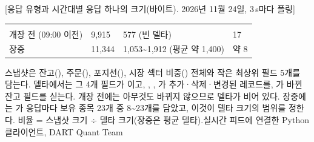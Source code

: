 [응답 유형과 시간대별  응답 하나의 크기(바이트). 2026년 11월 24일, 3\,s마다 폴링]{%
{\tabfont\begin{tabularx}{\linewidth}{>{\RaggedRight\arraybackslash}X R{26mm} R{50mm} R{14mm}}
 &  &  & \\
\rowsep
개장 전 (09:00 이전) & 9,915 & 577 (빈 델타) & 17\\
\rowsep
장중 & 11,344 & 1,053\textasciitilde 1,912 (평균 약 1,400) & 약 8\\
\end{tabularx}}
}{스냅샷은 잔고(), 주문(), 포지션(), 시장 섹터 비중() 전체와 작은 최상위 필드 5개를 담는다. 델타에서는 그 4개 필드가 이고, , , 가 추가·삭제·변경된 레코드를, 가 바뀐 잔고 필드를 싣는다. 개장 전에는 아무것도 바뀌지 않으므로 델타가 비어 있다. 장중에는 가 응답마다 보유 종목 23개 중 8\textasciitilde 23개를 담았고, 이것이 델타 크기의 범위를 정한다. 비율 = 스냅샷 크기 ÷ 델타 크기(장중은 평균 델타).}{실시간 피드에 연결한 Python 클라이언트, DART Quant Team}
